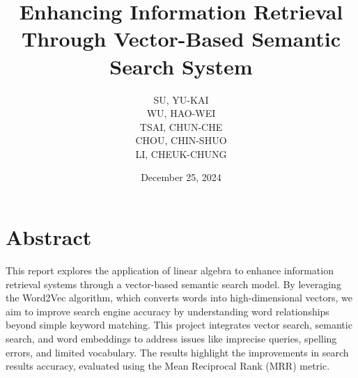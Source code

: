 \documentclass{article}
\title{Enhancing Information Retrieval Through Vector-Based Semantic Search System}
\author{
    SU, YU-KAI \\
    WU, HAO-WEI \\
    TSAI, CHUN-CHE \\
    CHOU, CHIN-SHUO \\
    LI, CHEUK-CHUNG \\
}
\date{December 25, 2024}
\begin{document}
\maketitle
\vspace{-1cm}

\section{Abstract}
This report explores the application of linear algebra to enhance information retrieval systems through a vector-based semantic search model. By leveraging the Word2Vec algorithm, which converts words into high-dimensional vectors, we aim to improve search engine accuracy by understanding word relationships beyond simple keyword matching. This project integrates vector search, semantic search, and word embeddings to address issues like imprecise queries, spelling errors, and limited vocabulary. The results highlight the improvements in search results accuracy, evaluated using the Mean Reciprocal Rank (MRR) metric.











\newpage

\end{document}
